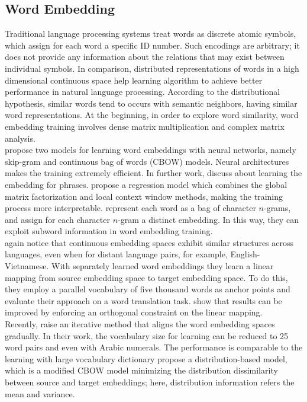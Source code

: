 \subsection{Word Embedding}
\indent Traditional language processing systems treat words as discrete atomic symbols, which assign for each word a specific ID number. Such encodings are arbitrary; it does not provide any information about the relations that may exist between individual symbols. In comparison, distributed representations of words in a high dimensional continuous space help learning algorithm to achieve better performance in natural language processing. According to the distributional hypothesis, similar words tend to occurs with semantic neighbors, having similar word representations. At the beginning, in order to explore word similarity, word embedding training involves dense matrix multiplication and complex matrix analysis. \\
\cite{mikolov2013efficient} propose two models for learning word embeddings with neural networks, namely skip-gram and continuous bag of words (CBOW) models. Neural architectures makes the training extremely efficient. In further work, \cite{mikolov2013distributed} discuss about learning the embedding for phrases. \cite{pennington2014glove} propose a regression model which combines the global matrix factorization and local context window methods, making the training process more interpretable. \cite{bojanowski2016enriching} represent each word as a bag of character $n$-grams, and assign for each character $n$-gram a distinct embedding. In this way, they can exploit subword information in word embedding training. \\
\cite{mikolov2013exploiting} again notice that continuous embedding spaces exhibit similar structures across languages, even when for distant language pairs, for example, English-Vietnamese.  With separately learned word embeddings they learn a linear mapping from source embedding space to target embedding space. To do this, they employ a parallel vocabulary of five thousand words as anchor points and evaluate their approach on a word translation task. \cite{xing2015normalized} show that results can be improved by enforcing an orthogonal constraint on the linear mapping. \\
Recently, \cite{artetxe2017learning} raise an iterative method that aligns the word embedding spaces gradually. In their work, the vocabulary size for learning can be reduced to 25 word pairs and even with Arabic numerals. The performance is comparable to the learning with large vocabulary dictionary \cite{cao2016distribution} propose a distribution-based model, which is a modified CBOW model minimizing the distribution dissimilarity between source and target embeddings; here, distribution information refers the mean and variance. 
